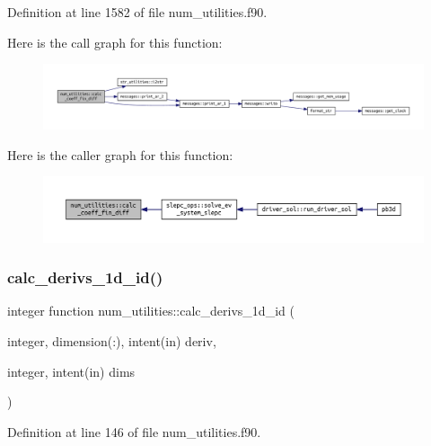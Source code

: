 Definition at line 1582 of file num\+\_\+utilities.\+f90.

Here is the call graph for this function\+:
\nopagebreak
\begin{figure}[H]
\begin{center}
\leavevmode
\includegraphics[width=350pt]{namespacenum__utilities_a87132bd5006387bcc2afe5ca375f0830_cgraph}
\end{center}
\end{figure}
Here is the caller graph for this function\+:
\nopagebreak
\begin{figure}[H]
\begin{center}
\leavevmode
\includegraphics[width=350pt]{namespacenum__utilities_a87132bd5006387bcc2afe5ca375f0830_icgraph}
\end{center}
\end{figure}
\mbox{\label{namespacenum__utilities_af2e9ffd7ce2f9391bf8b6f1c344fabca}} 
\subsubsection{\texorpdfstring{calc\+\_\+derivs\+\_\+1d\+\_\+id()}{calc\_derivs\_1d\_id()}}
{\footnotesize\ttfamily integer function num\+\_\+utilities\+::calc\+\_\+derivs\+\_\+1d\+\_\+id (\begin{DoxyParamCaption}\item[{integer, dimension(\+:), intent(in)}]{deriv,  }\item[{integer, intent(in)}]{dims }\end{DoxyParamCaption})}



Definition at line 146 of file num\+\_\+utilities.\+f90.

